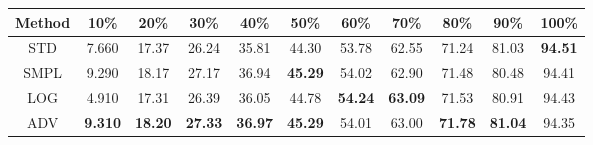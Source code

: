 \documentclass{standalone}
\begin{document}
\begin{tabular}{c|cccccccccc}
      \toprule
      Method & 10\% & 20\% & 30\% & 40\% & 50\% & 60\% & 70\% & 80\% & 90\% & 100\% \\
      \midrule
STD & 7.660 & 17.37 & 26.24 & 35.81 & 44.30 & 53.78 & 62.55 & 71.24 & 81.03 & \textbf{94.51}\\
SMPL & 9.290 & 18.17 & 27.17 & 36.94 & \textbf{45.29} & 54.02 & 62.90 & 71.48 & 80.48 & 94.41\\
LOG & 4.910 & 17.31 & 26.39 & 36.05 & 44.78 & \textbf{54.24} & \textbf{63.09} & 71.53 & 80.91 & 94.43\\
ADV & \textbf{9.310} & \textbf{18.20} & \textbf{27.33} & \textbf{36.97} & \textbf{45.29} & 54.01 & 63.00 & \textbf{71.78} & \textbf{81.04} & 94.35\\
  \bottomrule
\end{tabular}
\end{document}
